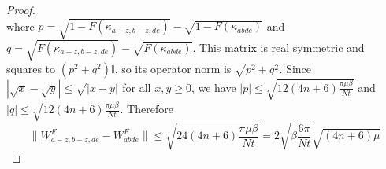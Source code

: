 \begin{proof}
\begin{equation}
\end{equation}
where $p=\sqrt{1-F(\kappa_{a-z,b-z,de})}-\sqrt{1-F(\kappa_{abde})}$ and $q=\sqrt{F(\kappa_{a-z,b-z,de})}-\sqrt{F(\kappa_{abde})}$. This matrix is real symmetric and squares to $(p^2+q^2)\mathbb{I}$, so its operator norm is $\sqrt{p^2+q^2}$. Since $|\sqrt{x}-\sqrt{y}|\le\sqrt{|x-y|}$ for all $x,y\ge 0$, we have $|p|\leq \sqrt{12(4n+6)\frac{\pi\mu\beta}{Nt}}$ and $|q|\leq \sqrt{12(4n+6)\frac{\pi\mu\beta}{Nt}}$. Therefore
\begin{equation}
    \|W^F_{a-z,b-z,de}-W^F_{abde}\|\le\sqrt{24(4n+6)\frac{\pi\mu\beta}{Nt}}
    =2\sqrt{\beta\frac{6\pi}{Nt}}\sqrt{(4n+6)\mu}
\end{equation}
\end{proof}
